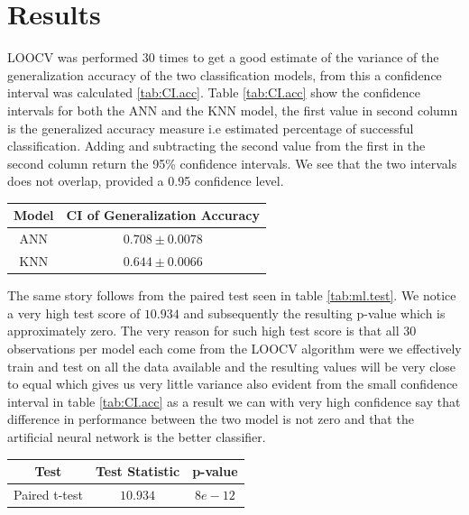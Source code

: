 \documentclass{article}
\begin{document}
\section{Results}
LOOCV was performed 30 times to get a good estimate of the variance of the generalization accuracy of the two classification models, from this a confidence interval was calculated \ref{tab:CI.acc}. Table \ref{tab:CI.acc} show the confidence intervals for both the ANN and the KNN model, the first value in second column is the generalized accuracy measure i.e estimated percentage of successful classification. Adding and subtracting the second value from the first in the second column return the 95\% confidence intervals. We see that the two intervals does not overlap, provided a 0.95 confidence level.\bigskip

\begin{minipage}{\linewidth}
\centering
{} 
\begin{tabular}{ c c}\toprule[2pt]
\bf Model  & \bf CI of Generalization Accuracy \\\midrule[1.5pt]
ANN  & $0.708 \pm 0.0078$  \\\midrule
KNN  & $0.644 \pm 0.0066$ \\
\bottomrule[1.25pt]
\end {tabular}\par
\label{tab:CI.acc}
\end{minipage}\bigskip

\noindent The same story follows from the paired test seen in table \ref{tab:ml.test}. We notice a very high test score of $10.934$ and subsequently the resulting p-value which is approximately zero. The very reason for such high test score is that all 30 observations per model each come from the LOOCV algorithm were we effectively train and test on all the data available and the resulting values will be very close to equal which gives us very little variance also evident from the small confidence interval in table \ref{tab:CI.acc} as a result we can with very high confidence say that difference in performance between the two model is not zero and that the artificial neural network is the better classifier.\bigskip

\begin{minipage}{\linewidth}
	\centering
	\begin{tabular}{ c c c}\toprule[1.5pt]
	\bf Test  & \bf Test Statistic & \bf p-value \\\midrule[1.5pt]
	Paired t-test  & $10.934$ &  $8e-12$ \\
	\bottomrule[1.5pt]
	\end {tabular}\par
	\label{tab:ml.test}
\end{minipage} \bigskip
\end{document}
